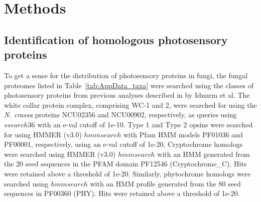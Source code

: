 \section{Methods}

\subsection*{Identification of homologous photosensory proteins}
To get a sense for the distribution of photosensory proteins in fungi, the fungal proteomes listed in Table~\ref{tab:AppData_taxa} were searched using the classes of photosensory proteins from previous analyses described in by Idnurm et al. The white collar protein complex, comprising WC-1 and 2, were searched for using the \textit{N. crassa} proteins NCU02356 and NCU00902, respectively, as queries using $ssearch36$ with an e-val cutoff of 1e-10. Type 1 and Type 2 opsins were searched for using HMMER (v3.0) $hmmsearch$ with Pfam HMM models PF01036 and PF00001, respectively, using an e-val cutoff of 1e-20. Cryptochrome homologs were searched using HMMER (v3.0) $hmmsearch$ with an HMM generated from the 20 seed sequences in the PFAM domain PF12546 (Cryptochrome\_C). Hits were retained above a threshold of 1e-20. Similarly, phytochrome homologs were searched using $hmmsearch$ with an HMM profile generated from the 80 seed sequences in PF00360 (PHY). Hits were retained above a threshold of 1e-20.\\

